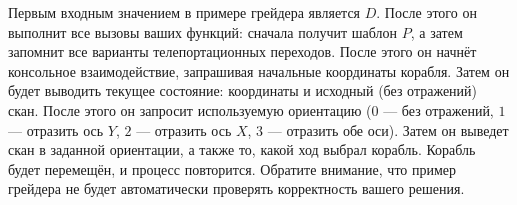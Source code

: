 \documentclass[12pt]{article}
\begin{document}
Первым входным значением в примере грейдера является $D$. После этого он выполнит все вызовы ваших функций: сначала получит шаблон $P$, а затем запомнит все варианты телепортационных переходов. После этого он начнёт консольное взаимодействие, запрашивая начальные координаты корабля. Затем он будет выводить текущее состояние: координаты и исходный (без отражений) скан. После этого он запросит используемую ориентацию ($0$ --- без отражений, $1$ --- отразить ось $Y$, $2$ --- отразить ось $X$, $3$ --- отразить обе оси). Затем он выведет скан в заданной ориентации, а также то, какой ход выбрал корабль. Корабль будет перемещён, и процесс повторится. Обратите внимание, что пример грейдера не будет автоматически проверять корректность вашего решения.
\end{document}
